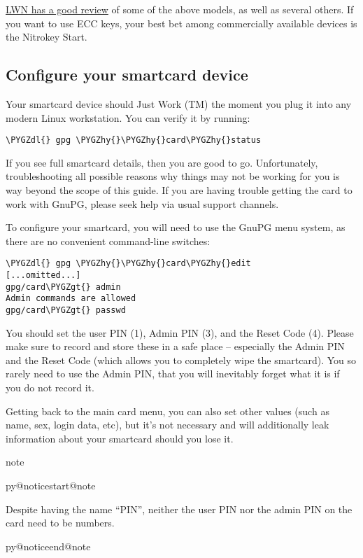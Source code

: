 \documentclass[a4paper,8pt,english]{sphinxmanual}
\makeatletter
\renewenvironment{notice}[2]{%
          \def\py@noticetype{#1}
          \begin{coloredbox}{#1}
          \bf\it
          \par\strong{#2}
          \csname py@noticestart@#1\endcsname
        }
	{
          \csname py@noticeend@\py@noticetype\endcsname
          \end{coloredbox}
        }
\def\PYGZgt{\char`\>}
\def\PYGZdl{\char`\$}
\def\PYGZhy{\char`\-}
\makeatother
\begin{document}
\href{https://lwn.net/Articles/736231/}{LWN has a good review} of some of the above models, as well as several
others. If you want to use ECC keys, your best bet among commercially
available devices is the Nitrokey Start.


\subsection{Configure your smartcard device}
\label{process/maintainer-pgp-guide:lwn-has-a-good-review}\label{process/maintainer-pgp-guide:configure-your-smartcard-device}
Your smartcard device should Just Work (TM) the moment you plug it into
any modern Linux workstation. You can verify it by running:

\begin{Verbatim}[commandchars=\\\{\}]
\PYGZdl{} gpg \PYGZhy{}\PYGZhy{}card\PYGZhy{}status
\end{Verbatim}

If you see full smartcard details, then you are good to go.
Unfortunately, troubleshooting all possible reasons why things may not
be working for you is way beyond the scope of this guide. If you are
having trouble getting the card to work with GnuPG, please seek help via
usual support channels.

To configure your smartcard, you will need to use the GnuPG menu system, as
there are no convenient command-line switches:

\begin{Verbatim}[commandchars=\\\{\}]
\PYGZdl{} gpg \PYGZhy{}\PYGZhy{}card\PYGZhy{}edit
[...omitted...]
gpg/card\PYGZgt{} admin
Admin commands are allowed
gpg/card\PYGZgt{} passwd
\end{Verbatim}

You should set the user PIN (1), Admin PIN (3), and the Reset Code (4).
Please make sure to record and store these in a safe place -- especially
the Admin PIN and the Reset Code (which allows you to completely wipe
the smartcard).  You so rarely need to use the Admin PIN, that you will
inevitably forget what it is if you do not record it.

Getting back to the main card menu, you can also set other values (such
as name, sex, login data, etc), but it's not necessary and will
additionally leak information about your smartcard should you lose it.

\begin{notice}{note}{Note:}
Despite having the name ``PIN'', neither the user PIN nor the admin
PIN on the card need to be numbers.
\end{notice}
\end{document}
